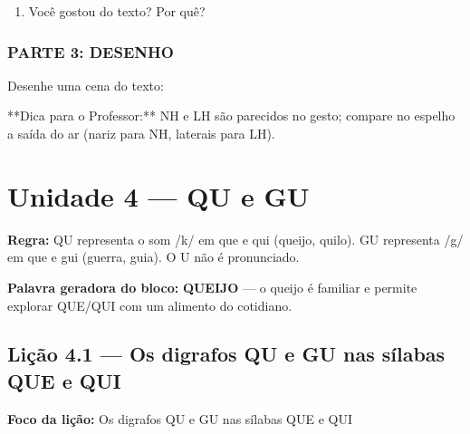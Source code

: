 \begin{exercicio}
\begin{enumerate}
  \item Você gostou do texto? Por quê?
  \begin{center}
  \underline{\hspace{12cm}}
  \end{center}

\end{enumerate}

\subsection*{PARTE 3: DESENHO}

Desenhe uma cena do texto:

\begin{center}
\end{center}

\end{exercicio}

\begin{dica}
**Dica para o Professor:** NH e LH são parecidos no gesto; compare no espelho a saída do ar (nariz para NH, laterais para LH).
\end{dica}



\chapter{Unidade 4 --- QU e GU}


\textbf{Regra:} QU representa o som /k/ em que e qui (queijo, quilo). GU representa /g/ em que e gui (guerra, guia). O U não é pronunciado.

\textbf{Palavra geradora do bloco:} \textbf{QUEIJO} --- o queijo é familiar e permite explorar QUE/QUI com um alimento do cotidiano.

\section{Lição 4.1 --- Os digrafos QU e GU nas sílabas QUE e QUI}

\textbf{Foco da lição:} Os digrafos QU e GU nas sílabas QUE e QUI


